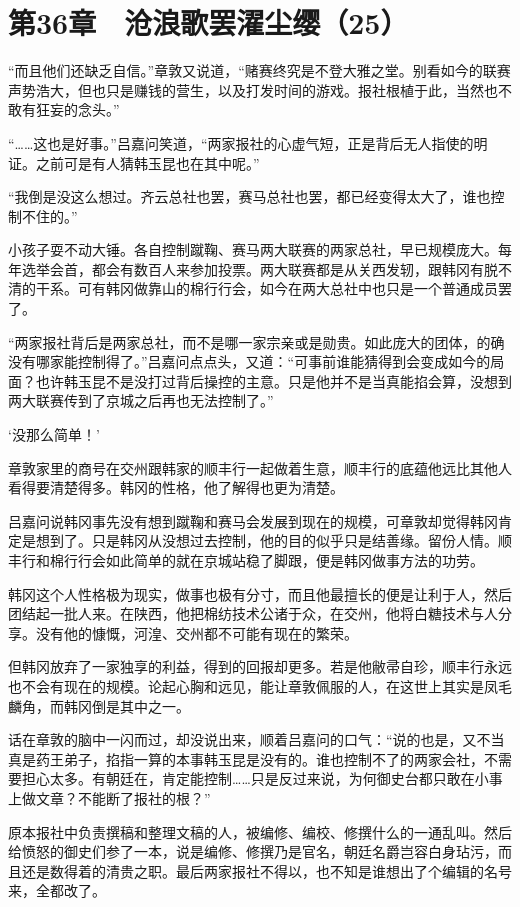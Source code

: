 \section{第36章　沧浪歌罢濯尘缨（25）}

“而且他们还缺乏自信。”章敦又说道，“赌赛终究是不登大雅之堂。别看如今的联赛声势浩大，但也只是赚钱的营生，以及打发时间的游戏。报社根植于此，当然也不敢有狂妄的念头。”

“……这也是好事。”吕嘉问笑道，“两家报社的心虚气短，正是背后无人指使的明证。之前可是有人猜韩玉昆也在其中呢。”

“我倒是没这么想过。齐云总社也罢，赛马总社也罢，都已经变得太大了，谁也控制不住的。”

小孩子耍不动大锤。各自控制蹴鞠、赛马两大联赛的两家总社，早已规模庞大。每年选举会首，都会有数百人来参加投票。两大联赛都是从关西发轫，跟韩冈有脱不清的干系。可有韩冈做靠山的棉行行会，如今在两大总社中也只是一个普通成员罢了。

“两家报社背后是两家总社，而不是哪一家宗亲或是勋贵。如此庞大的团体，的确没有哪家能控制得了。”吕嘉问点点头，又道：“可事前谁能猜得到会变成如今的局面？也许韩玉昆不是没打过背后操控的主意。只是他并不是当真能掐会算，没想到两大联赛传到了京城之后再也无法控制了。”

‘没那么简单！’

章敦家里的商号在交州跟韩家的顺丰行一起做着生意，顺丰行的底蕴他远比其他人看得要清楚得多。韩冈的性格，他了解得也更为清楚。

吕嘉问说韩冈事先没有想到蹴鞠和赛马会发展到现在的规模，可章敦却觉得韩冈肯定是想到了。只是韩冈从没想过去控制，他的目的似乎只是结善缘。留份人情。顺丰行和棉行行会如此简单的就在京城站稳了脚跟，便是韩冈做事方法的功劳。

韩冈这个人性格极为现实，做事也极有分寸，而且他最擅长的便是让利于人，然后团结起一批人来。在陕西，他把棉纺技术公诸于众，在交州，他将白糖技术与人分享。没有他的慷慨，河湟、交州都不可能有现在的繁荣。

但韩冈放弃了一家独享的利益，得到的回报却更多。若是他敝帚自珍，顺丰行永远也不会有现在的规模。论起心胸和远见，能让章敦佩服的人，在这世上其实是凤毛麟角，而韩冈倒是其中之一。

话在章敦的脑中一闪而过，却没说出来，顺着吕嘉问的口气：“说的也是，又不当真是药王弟子，掐指一算的本事韩玉昆是没有的。谁也控制不了的两家会社，不需要担心太多。有朝廷在，肯定能控制……只是反过来说，为何御史台都只敢在小事上做文章？不能断了报社的根？”

原本报社中负责撰稿和整理文稿的人，被编修、编校、修撰什么的一通乱叫。然后给愤怒的御史们参了一本，说是编修、修撰乃是官名，朝廷名爵岂容白身玷污，而且还是数得着的清贵之职。最后两家报社不得以，也不知是谁想出了个编辑的名号来，全都改了。

